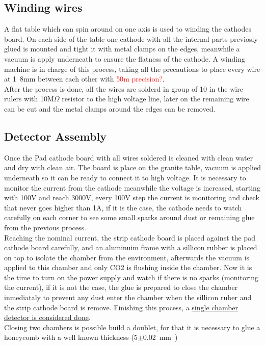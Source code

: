 \subsection{Winding wires} A flat table which can spin around on one axis is used to winding the cathodes board. On each
side of the table one cathode with all the internal parts previosly glued is mounted and tight it with metal clamps on
the edges, meanwhile a vacuum is apply underneath to ensure the flatness of the cathode.  A winding machine is in charge
of this process, taking all the precautions to place every wire at \unit{1.8}{mm} between each other with
\textcolor{red}{\unit{50}{\micro m} precision?}.\\ After the process is done, all the wires are solderd in group of 10
in the wire rulers with \unit{10}{M$\Omega$} resistor to the high voltage line, later on the remaining wire can be cut
and the metal clamps around the edges can be removed. 


\subsection{Detector Assembly}

Once the Pad cathode board with all wires soldered is cleaned with clean water and dry with clean air. The board is
place on the granite table, vacuum is applied underneath so it can be ready to connect it to high voltage. It is
necessary to monitor the current from the cathode meanwhile the voltage is increased, starting with 100V and reach
3000V, every 100V step the current is monitoring and check that never goes higher than \unit{1}{\micro A}, if it is the
case, the cathode needs to watch carefully on each corner to see some small sparks around dust or remaining glue from
the previous process.\\ Reaching the nominal current, the strip cathode board is placed against the pad cathode board
carefully, and an aluminuim frame with a sillicon rubber is placed on top to isolate the chamber from the environment,
afterwards the vacuum is applied to this chamber and only CO2 is flushing inside the chamber. Now it is the time to turn
on the power supply and watch if there is no sparks (monitoring the current), if it is not the case, the glue is
prepared to close the chamber inmediataly to prevent any dust enter the chamber when the sillicon ruber and the strip
cathode board is remove. Finishing this process, a \underline{single chamber detector is considered done}.\\ Closing two
chambers is possible build a doublet, for that it is necessary to glue a honeycomb with a well known thickness
(\unit{5$\pm$0.02}{mm}) 



